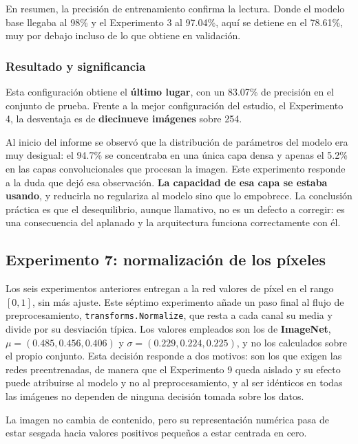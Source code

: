 \documentclass[11pt, a4paper]{article}
\begin{document}
En resumen, la precisión de entrenamiento confirma la lectura. Donde el modelo base llegaba al 98\% y el Experimento 3 al 97.04\%, aquí se detiene en el 78.61\%, muy por debajo incluso de lo que obtiene en validación.

\subsubsection{Resultado y significancia}

Esta configuración obtiene el \textbf{último lugar}, con un 83.07\% de precisión en el conjunto de prueba. Frente a la mejor configuración del estudio, el Experimento 4, la desventaja es de \textbf{diecinueve imágenes} sobre 254.

Al inicio del informe se observó que la distribución de parámetros del modelo era muy desigual: el 94.7\% se concentraba en una única capa densa y apenas el 5.2\% en las capas convolucionales que procesan la imagen. Este experimento responde a la duda que dejó esa observación. \textbf{La capacidad de esa capa se estaba usando}, y reducirla no regulariza al modelo sino que lo empobrece. La conclusión práctica es que el desequilibrio, aunque llamativo, no es un defecto a corregir: es una consecuencia del aplanado y la arquitectura funciona correctamente con él.

\subsection{Experimento 7: normalización de los píxeles}

Los seis experimentos anteriores entregan a la red valores de píxel en el rango $[0, 1]$, sin más ajuste. Este séptimo experimento añade un paso final al flujo de preprocesamiento, \texttt{transforms\allowbreak.Normalize}, que resta a cada canal su media y divide por su desviación típica. Los valores empleados son los de \textbf{ImageNet}, $\mu = (0.485, 0.456, 0.406)$ y $\sigma = (0.229, 0.224, 0.225)$, y no los calculados sobre el propio conjunto. Esta decisión responde a dos motivos: son los que exigen las redes preentrenadas, de manera que el Experimento 9 queda aislado y su efecto puede atribuirse al modelo y no al preprocesamiento, y al ser idénticos en todas las imágenes no dependen de ninguna decisión tomada sobre los datos.

La imagen no cambia de contenido, pero su representación numérica pasa de estar sesgada hacia valores positivos pequeños a estar centrada en cero.
\end{document}
